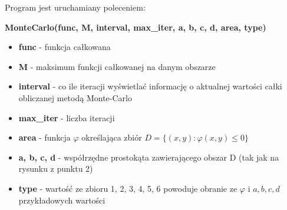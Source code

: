 \documentclass[]{article}
\begin{document}
Program jest uruchamiany poleceniem:
\begin{center}
	\textbf{MonteCarlo(func, M, interval, max\_iter, a, b, c, d, area, type)}
\end{center} 
\begin{itemize}
	\item \textbf{func} - funkcja całkowana
	\item \textbf{M} - maksimum funkcji całkowanej na danym obszarze
	\item \textbf{interval} - co ile iteracji wyświetlać informację o aktualnej wartości całki obliczanej metodą Monte-Carlo
	\item \textbf{max\_iter} - liczba iteracji
	\item \textbf{area} - funkcja $\varphi$ określająca zbiór $D=\{(x,y) : \varphi(x,y) \leqslant 0\}$
	\item \textbf{a, b, c, d} - współrzędne prostokąta zawierającego obszar D (tak jak na rysunku z punktu 2)
	\item \textbf{type} - wartość ze zbioru 1, 2, 3, 4, 5, 6 powoduje obranie ze $\varphi$ i $a, b, c, d$ przykładowych wartości


\end{itemize}
\end{document}
